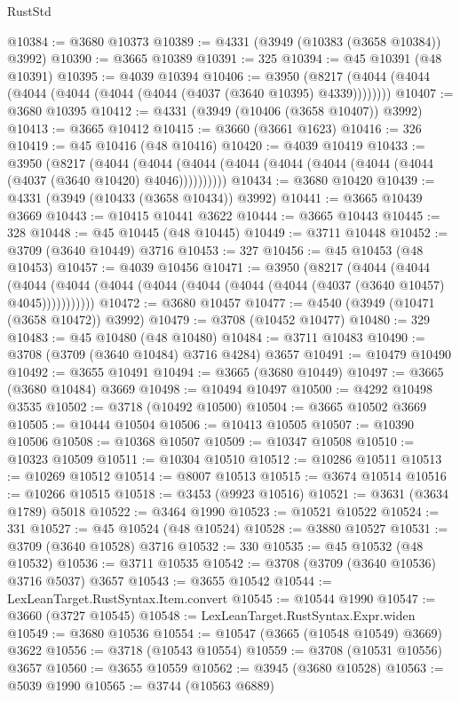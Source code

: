 \begin{lexlean}{RustStd}
\begin{coremodule}
@10384 := @3680 @10373
@10389 := @4331 (@3949 (@10383 (@3658 @10384)) @3992)
@10390 := @3665 @10389
@10391 := 325
@10394 := @45 @10391 (@48 @10391)
@10395 := @4039 @10394
@10406 := @3950 (@8217 (@4044 (@4044 (@4044 (@4044 (@4044 (@4044 (@4037 (@3640 @10395) @4339))))))))
@10407 := @3680 @10395
@10412 := @4331 (@3949 (@10406 (@3658 @10407)) @3992)
@10413 := @3665 @10412
@10415 := @3660 (@3661 @1623)
@10416 := 326
@10419 := @45 @10416 (@48 @10416)
@10420 := @4039 @10419
@10433 := @3950
    (@8217
      (@4044 (@4044 (@4044 (@4044 (@4044 (@4044 (@4044 (@4044 (@4037 (@3640 @10420) @4046))))))))))
@10434 := @3680 @10420
@10439 := @4331 (@3949 (@10433 (@3658 @10434)) @3992)
@10441 := @3665 @10439 @3669
@10443 := @10415 @10441 @3622
@10444 := @3665 @10443
@10445 := 328
@10448 := @45 @10445 (@48 @10445)
@10449 := @3711 @10448
@10452 := @3709 (@3640 @10449) @3716
@10453 := 327
@10456 := @45 @10453 (@48 @10453)
@10457 := @4039 @10456
@10471 := @3950
    (@8217
      (@4044
        (@4044
          (@4044 (@4044 (@4044 (@4044 (@4044 (@4044 (@4044 (@4037 (@3640 @10457) @4045)))))))))))
@10472 := @3680 @10457
@10477 := @4540 (@3949 (@10471 (@3658 @10472)) @3992)
@10479 := @3708 (@10452 @10477)
@10480 := 329
@10483 := @45 @10480 (@48 @10480)
@10484 := @3711 @10483
@10490 := @3708 (@3709 (@3640 @10484) @3716 @4284) @3657
@10491 := @10479 @10490
@10492 := @3655 @10491
@10494 := @3665 (@3680 @10449)
@10497 := @3665 (@3680 @10484) @3669
@10498 := @10494 @10497
@10500 := @4292 @10498 @3535
@10502 := @3718 (@10492 @10500)
@10504 := @3665 @10502 @3669
@10505 := @10444 @10504
@10506 := @10413 @10505
@10507 := @10390 @10506
@10508 := @10368 @10507
@10509 := @10347 @10508
@10510 := @10323 @10509
@10511 := @10304 @10510
@10512 := @10286 @10511
@10513 := @10269 @10512
@10514 := @8007 @10513
@10515 := @3674 @10514
@10516 := @10266 @10515
@10518 := @3453 (@9923 @10516)
@10521 := @3631 (@3634 @1789) @5018
@10522 := @3464 @1990
@10523 := @10521 @10522
@10524 := 331
@10527 := @45 @10524 (@48 @10524)
@10528 := @3880 @10527
@10531 := @3709 (@3640 @10528) @3716
@10532 := 330
@10535 := @45 @10532 (@48 @10532)
@10536 := @3711 @10535
@10542 := @3708 (@3709 (@3640 @10536) @3716 @5037) @3657
@10543 := @3655 @10542
@10544 := LexLeanTarget.RustSyntax.Item.convert
@10545 := @10544 @1990
@10547 := @3660 (@3727 @10545)
@10548 := LexLeanTarget.RustSyntax.Expr.widen
@10549 := @3680 @10536
@10554 := @10547 (@3665 (@10548 @10549) @3669) @3622
@10556 := @3718 (@10543 @10554)
@10559 := @3708 (@10531 @10556) @3657
@10560 := @3655 @10559
@10562 := @3945 (@3680 @10528)
@10563 := @5039 @1990
@10565 := @3744 (@10563 @6889)

\end{coremodule}
\end{lexlean}
